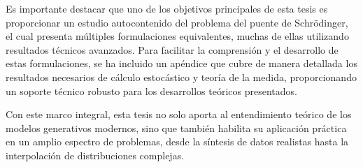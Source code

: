 Es importante destacar que uno de los objetivos principales de esta tesis es proporcionar un estudio autocontenido del problema del puente de Schrödinger, el cual presenta múltiples formulaciones equivalentes, muchas de ellas utilizando resultados técnicos avanzados. Para facilitar la comprensión y el desarrollo de estas formulaciones, se ha incluido un apéndice que cubre de manera detallada los resultados necesarios de cálculo estocástico y teoría de la medida, proporcionando un soporte técnico robusto para los desarrollos teóricos presentados.

Con este marco integral, esta tesis no solo aporta al entendimiento teórico de los modelos generativos modernos, sino que también habilita su aplicación práctica en un amplio espectro de problemas, desde la síntesis de datos realistas hasta la interpolación de distribuciones complejas.